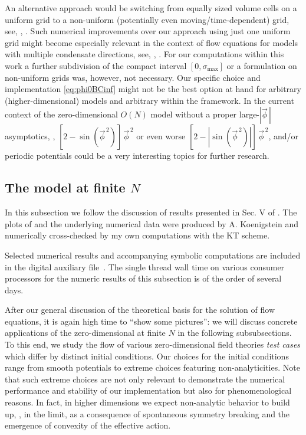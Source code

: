An alternative approach would be switching from equally sized volume cells on a uniform grid to a non-uniform (potentially even moving/time-dependent) grid, see, \eg{}, .
Such numerical improvements over our approach using just one uniform \fv{} grid might become especially relevant in the context of \frg{} flow equations for models with multiple condensate directions, see, \eg{}, .
For our computations within this work a further subdivision of the compact interval $[ 0, \sigma_\mathrm{max} ]$ or a formulation on non-uniform grids was, however, not necessary.
Our specific choice and implementation \eqref{eq:phi0BCinf} might not be the best option at hand for arbitrary (higher-dimensional) models and arbitrary \ics{} within the \frg{} framework.
In the current context of the zero-dimensional $O(N)$ model \ics{} without a proper large-$| \vec{\phi} \, |$ asymptotics, \eg{}, $[ 2 - \sin ( \vec{\phi}^{\, 2} )] \, \vec{\phi}^{\, 2}$ or even worse $[ 2 - | \sin( \vec{\phi}^{\, 2} ) | ] \, \vec{\phi}^{\, 2}$, and/or periodic potentials could be a very interesting topics for further research.

\subsection{The \ON{} model at finite \texorpdfstring{$N$}{N}}\label{subsec:0dONresults}
\begin{disclaimer}
	In this subsection we follow the discussion of results presented in Sec. V of .
	The plots of  and the underlying numerical data were produced by A. Koenigstein and numerically cross-checked by my own computations with the KT scheme.

	Selected numerical results and accompanying symbolic computations are included in the digital auxiliary file~\cite{Steil:2023zeroD}.
	The single thread wall time on various consumer processors for the numeric results of this subsection is of the order of several days.
\end{disclaimer}
After our general discussion of the theoretical basis for the solution of \frg{} flow equations, it is again high time to ``show some pictures'': we will discuss concrete applications of the zero-dimensional \ON{} at finite $N$ in the following subsubsections. 
To this end, we study the \frg{} flow of various zero-dimensional field theories \dash{} \textit{test cases} \dash{} which differ by distinct initial conditions.
Our choices for the initial conditions range from smooth potentials to extreme choices featuring non-analyticities.
Note that such extreme choices are not only relevant to demonstrate the numerical performance and stability of our implementation but also for phenomenological reasons.
In fact, in higher dimensions we expect non-analytic behavior to build up, \eg{}, in the \ir{} limit, as a consequence of spontaneous symmetry breaking and the emergence of convexity of the effective action.\clearpage


\FloatBarrier

\FloatBarrier

\FloatBarrier

	
\FloatBarrier


\FloatBarrier
